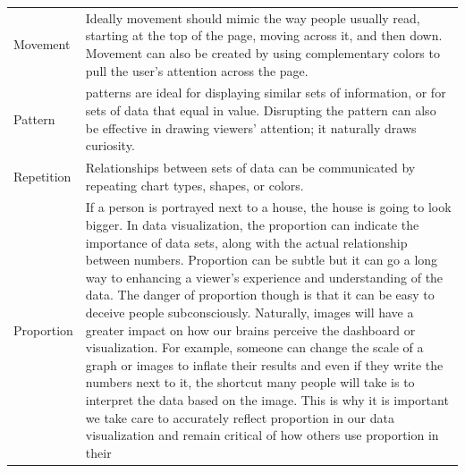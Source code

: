 \documentclass[]{book}
\theoremstyle{definition}
\theoremstyle{definition}
\theoremstyle{definition}
\theoremstyle{remark}
\begin{document}
\begin{longtable}[]{@{}ll@{}}
\begin{minipage}[t]{0.16\columnwidth}
Movement\strut
\end{minipage} & \begin{minipage}[t]{0.78\columnwidth}\raggedright\strut
Ideally movement should mimic the way people usually read, starting at
the top of the page, moving across it, and then down. Movement can also
be created by using complementary colors to pull the user's attention
across the page.\strut
\end{minipage}\tabularnewline
\begin{minipage}[t]{0.16\columnwidth}\raggedright\strut
Pattern\strut
\end{minipage} & \begin{minipage}[t]{0.78\columnwidth}\raggedright\strut
patterns are ideal for displaying similar sets of information, or for
sets of data that equal in value. Disrupting the pattern can also be
effective in drawing viewers' attention; it naturally draws
curiosity.\strut
\end{minipage}\tabularnewline
\begin{minipage}[t]{0.16\columnwidth}\raggedright\strut
Repetition\strut
\end{minipage} & \begin{minipage}[t]{0.78\columnwidth}\raggedright\strut
Relationships between sets of data can be communicated by repeating
chart types, shapes, or colors.\strut
\end{minipage}\tabularnewline
\begin{minipage}[t]{0.16\columnwidth}\raggedright\strut
Proportion\strut
\end{minipage} & \begin{minipage}[t]{0.78\columnwidth}\raggedright\strut
If a person is portrayed next to a house, the house is going to look
bigger. In data visualization, the proportion can indicate the
importance of data sets, along with the actual relationship between
numbers. Proportion can be subtle but it can go a long way to enhancing
a viewer's experience and understanding of the data. The danger of
proportion though is that it can be easy to deceive people
subconsciously. Naturally, images will have a greater impact on how our
brains perceive the dashboard or visualization. For example, someone can
change the scale of a graph or images to inflate their results and even
if they write the numbers next to it, the shortcut many people will take
is to interpret the data based on the image. This is why it is important
we take care to accurately reflect proportion in our data visualization
and remain critical of how others use proportion in their

\end{minipage}
\end{longtable}
\end{document}
